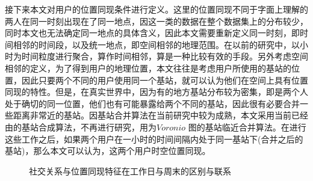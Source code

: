 接下来本文对用户的位置同现条件进行定义。这里的位置同现不同于字面上理解的两人在同一时刻出现在了同一地点，因这一类的数据在整个数据集上的分布较少，同时本文也无法确定同一地点的具体含义，因此本文需要重新定义同一时刻，即时间相邻的时间段，以及统一地点，即空间相邻的地理范围。在以前的研究中，以小时为时间粒度进行聚合，算作时间相邻，算是一种比较有效的手段。另外考虑空间相邻的定义，为了得到用户的地理位置，本文往往是考虑用户所使用的基站的位置，因此只要两个不同的用户使用同一个基站，就可以认为他们在空间上具有位置同现的特性。但是，在真实世界中，因为有的地方基站分布较为密集，即是两个人处于确切的同一位置，他们也有可能暴露给两个不同的基站，因此很有必要合并一些距离非常近的基站。因基站合并算法在当前研究中较为成熟，本文采用当前已经由的基站合成算法，不再进行研究，用为$Voronio$ 图的基站临近合并算法。在进行这些工作之后，如果两个用户在一小时的时间间隔内处于同一基站下(合并之后的基站)，那么本文可以认为，这两个用户时空位置同现。



\begin{figure}[!ht]
    \centering
    \hspace{7em} %
    \caption{社交关系与位置同现特征在工作日与周末的区别与联系}
    \label{fig-spatialhomo}
\end{figure}

